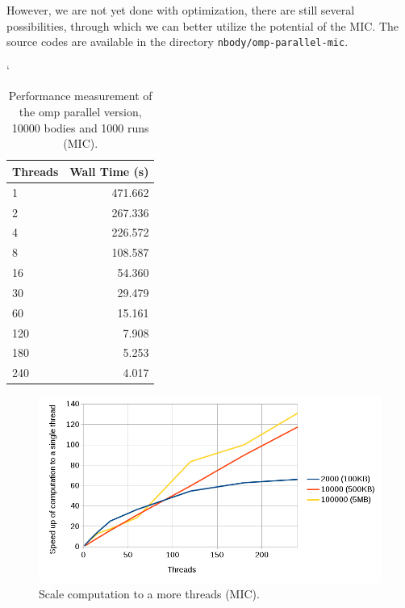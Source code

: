 \par However, we are not yet done with optimization, there are still several possibilities, through which we can better utilize the potential of the MIC. The source codes are available in the directory \texttt{nbody/omp-parallel-mic}.

\begin{table}[ht]
\catcode`
\begin{center}
\begin{tabular}{| l | r |} \hline
\textbf{Threads} & \textbf{Wall Time (s)}\\ \hline
1 & 471.662\\ \hline
2 & 267.336\\ \hline
4 & 226.572\\ \hline
8 & 108.587\\ \hline
16 & 54.360\\ \hline
30 & 29.479\\ \hline
60 & 15.161\\ \hline
120 & 7.908\\ \hline
180 & 5.253\\ \hline
240 & 4.017\\ \hline
\end{tabular}
\caption{Performance measurement of the omp parallel version, 10000 bodies and 1000 runs (MIC).}
\label{tab:table_nbody_scaling_mic}
\end{center}
\end{table}

\begin{figure}[htbp]
    \centering
    \includegraphics[width=1\linewidth]{fig/nbody_scaling_mic.png}
    \caption{Scale computation to a more threads (MIC).}
    \label{fig:graph_nbody_scaling_mic}
\end{figure} 

